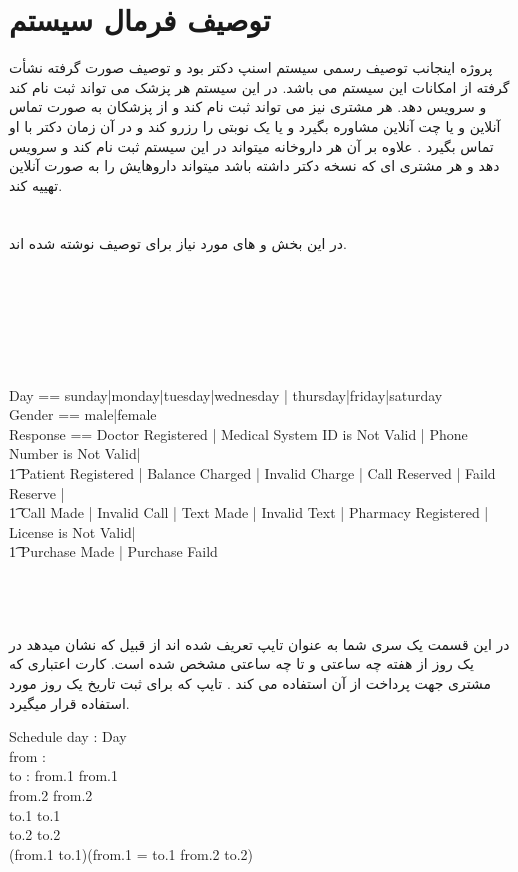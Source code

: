 \documentclass{article}
\title{\lr{Formal Specification and Verification of Programs}}
\author{\lr{3rd Assignment Solutions}\\
\lr{Mohammad Hossein Khoshechin - 99210164}\\
\lr{Group 2}}
\begin{document}
\maketitle

\section*{توصیف فرمال سیستم }

پروژه اینجانب توصیف رسمی سیستم اسنپ دکتر بود و توصیف صورت گرفته نشأت گرفته از امکانات این سیستم می باشد. در این سیستم هر پزشک می تواند ثبت نام کند و سرویس دهد. هر مشتری نیز می تواند ثبت نام کند و از پزشکان به صورت تماس آنلاین و یا چت آنلاین مشاوره بگیرد و یا یک نوبتی را رزرو کند و در آن زمان دکتر با او تماس بگیرد . علاوه بر آن هر داروخانه میتواند در این سیستم ثبت نام کند و سرویس دهد و هر مشتری ای که نسخه دکتر داشته باشد میتواند داروهایش را به صورت آنلاین تهییه کند.
\\
\\
\\
در این بخش  و  های مورد نیاز برای توصیف نوشته شده اند.

\begin{zed}
[Name]\\
[Major]\\
[Description]\\
[Prescription]\\
[BusinessLicense]\\
[Drug]\\
Day == sunday|monday|tuesday|wednesday | thursday|friday|saturday\\
Gender == male|female\\
Response == Doctor Registered | Medical System ID is Not Valid | Phone Number is Not Valid|\\
\t1 Patient Registered | Balance Charged | Invalid Charge | Call Reserved | Faild Reserve | \\
\t1 Call Made | Invalid Call | Text Made | Invalid Text | Pharmacy Registered | License  is Not Valid|\\
\t1 Purchase Made | Purchase Faild
\end{zed}
\\
\\
\\
در این قسمت یک سری شما به عنوان تایپ تعریف شده اند از قبیل  که نشان میدهد در یک روز از هفته چه ساعتی و تا چه ساعتی مشخص شده است. کارت اعتباری که مشتری جهت پرداخت از آن استفاده می کند . تایپ  که برای ثبت تاریخ یک روز مورد استفاده قرار میگیرد.
\begin{schema}{Schedule}
day : Day\\
from : \nat \cross \nat\\
to : \nat \cross \nat
\where
from.1  \land from.1 \\
from.2  \land from.2 \\
to.1  \land to.1 \\
to.2  \land to.2 \\
(from.1 \le to.1)\lor(from.1 = to.1 \land from.2 \le to.2)
\end{schema}
\end{document}
